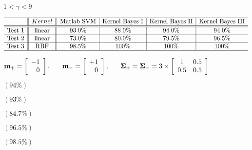 \documentclass{article}
\def\lthtmlcheckvsize{\ifdim\ht\sizebox<\vsize 
  \ifdim\wd\sizebox<\hsize\expandafter\hfill\fi \expandafter\vfill
  \else\expandafter\vss\fi}%
\begin{document}
{\newpage\clearpage
{}%
$ 1<\gamma<9$%
\lthtmlindisplaymathZ
\lthtmlcheckvsize\clearpage}

{\newpage\clearpage
{}%
\begin{displaymath}\begin{array}{l||c||c|c|c|c} \hline
& Kernel & \mbox{Matlab SVM} & \mbox{Kernel Bayes I} & \mbox{Kernel Bayes II} & \mbox{Kernel Bayes III}\\\hline\hline
\mbox{Test 1} & \mbox{linear} & 93.0\% & 88.0\% & 94.0\% & 94.0\%\\\hline
\mbox{Test 2} & \mbox{linear} & 73.0\% & 80.0\% & 79.5\% & 96.5\%\\\hline
\mbox{Test 3} & \mbox{RBF}    & 98.5\% & 100\% & 100\% & 100\%\\\hline
\end{array}\end{displaymath}%
\lthtmldisplayZ
\lthtmlcheckvsize\clearpage}

{\newpage\clearpage
{}%
$\displaystyle {\bf m}_+=\left[\begin{array}{r}-1\\0\end{array}\right],\;\;\;\;\;\;
{\bf m}_-=\left[\begin{array}{r}+1\\0\end{array}\right],\;\;\;\;\;\;
{\bf\Sigma}_+={\bf\Sigma}_-
=3\times \left[\begin{array}{cc}1&0.5\\0.5&0.5\end{array}\right]$%
\lthtmlindisplaymathZ
\lthtmlcheckvsize\clearpage}

{\newpage\clearpage
{}%
$ (94\%)$%
\lthtmlindisplaymathZ
\lthtmlcheckvsize\clearpage}

{\newpage\clearpage
{}%
$ (93\%)$%
\lthtmlindisplaymathZ
\lthtmlcheckvsize\clearpage}

{\newpage\clearpage
{}%
$ (84.7\%)$%
\lthtmlindisplaymathZ
\lthtmlcheckvsize\clearpage}

{\newpage\clearpage
{}%
$ (96.5\%)$%
\lthtmlindisplaymathZ
\lthtmlcheckvsize\clearpage}

{\newpage\clearpage
{}%
$ (98.5\%)$%
\lthtmlindisplaymathZ
\lthtmlcheckvsize\clearpage}
\end{document}
